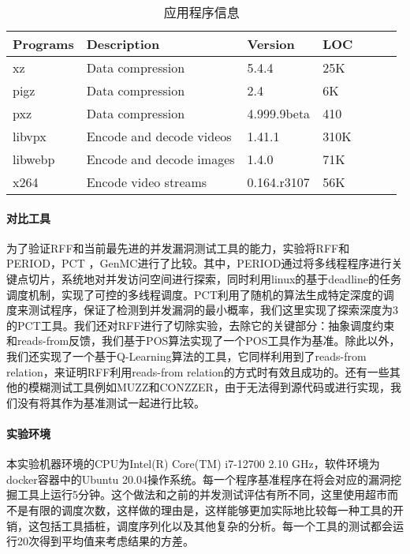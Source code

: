 \begin{table}
\caption{\label{tab:6app}应用程序信息}
\begin{spacing}{1.5}
\centering
\begin{tabular}{lllllll}
\toprule
 Programs & Description & Version & LOC \\
\midrule

xz & Data compression & 5.4.4 & 25K \\
pigz & Data compression & 2.4 & 6K \\
pxz & Data compression & 4.999.9beta & 410 \\
libvpx & Encode and decode videos & 1.41.1 & 310K \\
libwebp & Encode and decode images & 1.4.0 & 71K \\
x264 & Encode video streams & 0.164.r3107 & 56K \\

\bottomrule
\end{tabular}
\end{spacing}
\end{table}


\paragraph{对比工具}为了验证RFF和当前最先进的并发漏洞测试工具的能力，实验将RFF和PERIOD\cite{wen2022controlled}，PCT\cite{burckhardt2010randomized} ，GenMC\cite{kokologiannakis2019model, kokologiannakis2021genmc}进行了比较。其中，PERIOD通过将多线程程序进行关键点切片，系统地对并发访问空间进行探索，同时利用linux的基于deadline的任务调度机制，实现了可控的多线程调度。PCT利用了随机的算法生成特定深度的调度来测试程序，保证了检测到并发漏洞的最小概率，我们这里实现了探索深度为3的PCT工具。我们还对RFF进行了切除实验，去除它的关键部分：抽象调度约束和reads-from反馈，我们基于POS算法实现了一个POS工具作为基准。除此以外，我们还实现了一个基于Q-Learning算法的工具，它同样利用到了reads-from relation，来证明RFF利用reads-from relation的方式时有效且成功的。还有一些其他的模糊测试工具例如MUZZ\cite{chen2020muzz}和CONZZER\cite{jiang2022context}，由于无法得到源代码或进行实现，我们没有将其作为基准测试一起进行比较。

\paragraph{实验环境}本实验机器环境的CPU为Intel(R) Core(TM) i7-12700 2.10 GHz，软件环境为docker容器中的Ubuntu 20.04操作系统。每一个程序基准程序在将会对应的漏洞挖掘工具上运行5分钟。这个做法和之前的并发测试评估有所不同，这里使用超市而不是有限的调度次数，这样做的理由是，这样能够更加实际地比较每一种工具的开销，这包括工具插桩，调度序列化以及其他复杂的分析。每一个工具的测试都会运行20次得到平均值来考虑结果的方差。

